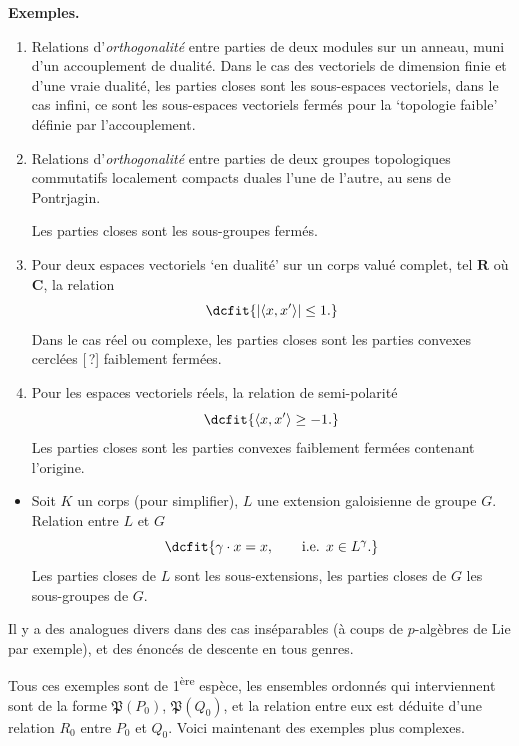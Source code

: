 \documentclass[11pt]{article}
\newcommand{\printedpage}[1]{\marginpar{\footnotesize p.~#1}}
\def\dcprintedpending{}
\newcommand{\msp}[1]{\marginpar{\footnotesize\raggedright
  \ifx\dcprintedpending\empty\else p.~\dcprintedpending\par\fi
  [#1]}\gdef\dcprintedpending{}}
\newcommand{\Pf}{\mathfrak{P}}
\begin{document}
\noindent\textbf{Exemples.}
\begin{enumerate}[label={\arabic*)}]
\item Relations d'\textit{orthogonalité} entre parties de deux modules sur un anneau, muni d'un accouplement de dualité. Dans le cas des vectoriels de dimension finie et d'une vraie dualité, les parties closes sont les sous-espaces vectoriels, dans le cas infini, ce sont les sous-espaces vectoriels fermés pour la `topologie faible' définie par l'accouplement.
\item Relations d'\textit{orthogonalité} entre parties de deux groupes topologiques commutatifs localement compacts duales l'une de l'autre, au sens de Pontrjagin.
\msp{79}

Les parties closes sont les sous-groupes fermés.
\item Pour deux espaces vectoriels `en dualité' sur un corps valué complet, tel $\mathbf{R}$ où $\mathbf{C}$, la relation %
\[
\dcfit{|\langle x, x' \rangle| \leq 1.
}
\]
Dans le cas réel ou complexe, les parties closes sont les parties convexes cerclées [\,?] faiblement fermées.
\item Pour les espaces vectoriels réels, la relation de semi-polarité
\[
\dcfit{\langle x, x' \rangle \geq -1.
}
\]
Les parties closes sont les parties convexes faiblement fermées contenant l'origine.
\end{enumerate}

\printedpage{49}

\begin{itemize}[leftmargin=2.5em]
\item[5)] Soit $K$ un corps (pour simplifier), $L$ une extension galoisienne de groupe $G$. Relation entre $L$ et $G$
\[
\dcfit{\gamma\cdot x=x,\qquad \text{i.e. } x\in L^{\gamma}.
}
\]
Les parties closes de $L$ sont les sous-extensions, les parties closes de $G$ les sous-groupes de $G$.
\end{itemize}

Il y a des analogues divers dans des cas inséparables (à coups de $p$-algèbres de Lie par exemple), et des énoncés de descente en tous genres.

\msp{page 80}Tous ces exemples sont de 1\textsuperscript{ère} espèce, les ensembles ordonnés qui interviennent sont de la forme $\Pf(P_0)$, $\Pf(Q_0)$, et la relation entre eux est déduite d'une relation $R_0$ entre $P_0$ et $Q_0$. Voici maintenant des exemples plus complexes.
\end{document}
